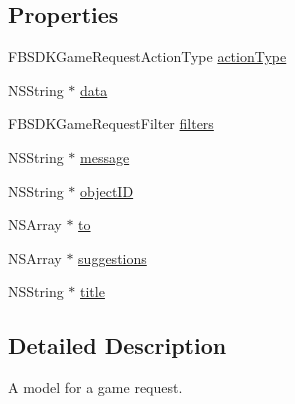 \subsection*{Properties}
\begin{DoxyCompactItemize}
\item 
F\-B\-S\-D\-K\-Game\-Request\-Action\-Type \hyperlink{interface_f_b_s_d_k_game_request_content_ac80b1bf36b265614546c38983ea55aa0}{action\-Type}
\item 
N\-S\-String $\ast$ \hyperlink{interface_f_b_s_d_k_game_request_content_a5842159d850c0e701d7753d64e1e22be}{data}
\item 
F\-B\-S\-D\-K\-Game\-Request\-Filter \hyperlink{interface_f_b_s_d_k_game_request_content_ae1268dd62ab78042145dd25bc4ef8961}{filters}
\item 
N\-S\-String $\ast$ \hyperlink{interface_f_b_s_d_k_game_request_content_a88accc7b486e626dae7d08e744a9af66}{message}
\item 
N\-S\-String $\ast$ \hyperlink{interface_f_b_s_d_k_game_request_content_a3ea25b3469e4471f3cde2d36fba75127}{object\-I\-D}
\item 
N\-S\-Array $\ast$ \hyperlink{interface_f_b_s_d_k_game_request_content_a2598b30779626fd9afdbac65c137b99b}{to}
\item 
N\-S\-Array $\ast$ \hyperlink{interface_f_b_s_d_k_game_request_content_affb3cc7aaecddb9dbd1ba01a222e8474}{suggestions}
\item 
N\-S\-String $\ast$ \hyperlink{interface_f_b_s_d_k_game_request_content_ae626589f2d4e7d36444d34a819989cef}{title}
\end{DoxyCompactItemize}


\subsection{Detailed Description}
A model for a game request. 

